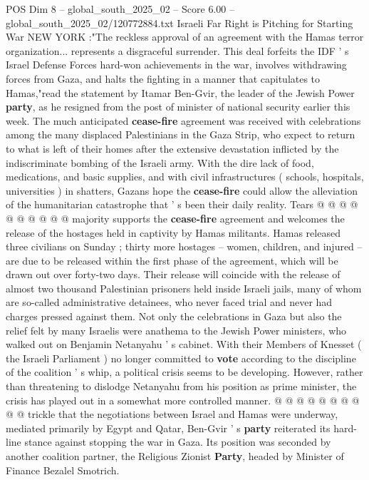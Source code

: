 \begin{textsample}{POS Dim 8 – global\_south\_2025\_02 – Score 6.00 – global\_south\_2025\_02/120772884.txt}  \label{ex:f8_pos_389}
Israeli Far Right is Pitching for Starting War NEW YORK :"The reckless approval of an agreement with the Hamas terror organization... represents a disgraceful surrender.
This deal forfeits the IDF ' s Israel Defense Forces hard-won achievements in the war, involves withdrawing forces from Gaza, and halts the fighting in a manner that capitulates to Hamas,"read the statement by Itamar Ben-Gvir, the leader of the Jewish Power \textbf{party}, as he resigned from the post of minister of national security earlier this week.
The much anticipated \textbf{cease-fire} agreement was received with celebrations among the many displaced Palestinians in the Gaza Strip, who expect to return to what is left of their homes after the extensive devastation inflicted by the indiscriminate bombing of the Israeli army.
With the dire lack of food, medications, and basic supplies, and with civil infrastructures ( schools, hospitals, universities ) in shatters, Gazans hope the \textbf{cease-fire} could allow the alleviation of the humanitarian catastrophe that ' s been their daily reality.
Tears @ @ @ @ @ @ @ @ @ @ majority supports the \textbf{cease-fire} agreement and welcomes the release of the hostages held in captivity by Hamas militants.
Hamas released three civilians on Sunday ; thirty more hostages -- women, children, and injured -- are due to be released within the first phase of the agreement, which will be drawn out over forty-two days.
Their release will coincide with the release of almost two thousand Palestinian prisoners held inside Israeli jails, many of whom are so-called administrative detainees, who never faced trial and never had charges pressed against them.
Not only the celebrations in Gaza but also the relief felt by many Israelis were anathema to the Jewish Power ministers, who walked out on Benjamin Netanyahu ' s cabinet.
With their Members of Knesset ( the Israeli Parliament ) no longer committed to \textbf{vote} according to the discipline of the coalition ' s whip, a political crisis seems to be developing.
However, rather than threatening to dislodge Netanyahu from his position as prime minister, the crisis has played out in a somewhat more controlled manner. @ @ @ @ @ @ @ @ @ @ trickle that the negotiations between Israel and Hamas were underway, mediated primarily by Egypt and Qatar, Ben-Gvir ' s \textbf{party} reiterated its hard-line stance against stopping the war in Gaza.
Its position was seconded by another coalition partner, the Religious Zionist \textbf{Party}, headed by Minister of Finance Bezalel Smotrich.

\end{textsample}

